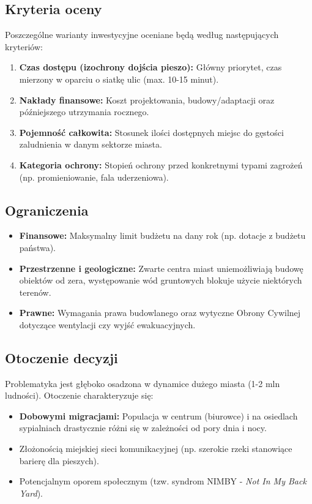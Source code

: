 \documentclass[12pt,a4paper]{article}
\begin{document}
\subsection{Kryteria oceny}
Poszczególne warianty inwestycyjne oceniane będą według następujących kryteriów:
\begin{enumerate}
    \item \textbf{Czas dostępu (izochrony dojścia pieszo):} Główny priorytet, czas mierzony w oparciu o siatkę ulic (max. 10-15 minut).
    \item \textbf{Nakłady finansowe:} Koszt projektowania, budowy/adaptacji oraz późniejszego utrzymania rocznego.
    \item \textbf{Pojemność całkowita:} Stosunek ilości dostępnych miejsc do gęstości zaludnienia w danym sektorze miasta.
    \item \textbf{Kategoria ochrony:} Stopień ochrony przed konkretnymi typami zagrożeń (np. promieniowanie, fala uderzeniowa).
\end{enumerate}

\subsection{Ograniczenia}
\begin{itemize}
    \item \textbf{Finansowe:} Maksymalny limit budżetu na dany rok (np. dotacje z budżetu państwa).
    \item \textbf{Przestrzenne i geologiczne:} Zwarte centra miast uniemożliwiają budowę obiektów od zera, występowanie wód gruntowych blokuje użycie niektórych terenów.
    \item \textbf{Prawne:} Wymagania prawa budowlanego oraz wytyczne Obrony Cywilnej dotyczące wentylacji czy wyjść ewakuacyjnych.
\end{itemize}

\subsection{Otoczenie decyzji}
Problematyka jest głęboko osadzona w dynamice dużego miasta (1-2 mln ludności). Otoczenie charakteryzuje się:
\begin{itemize}
    \item \textbf{Dobowymi migracjami:} Populacja w centrum (biurowce) i na osiedlach sypialniach drastycznie różni się w zależności od pory dnia i nocy.
    \item Złożonością miejskiej sieci komunikacyjnej (np. szerokie rzeki stanowiące barierę dla pieszych).
    \item Potencjalnym oporem społecznym (tzw. syndrom NIMBY - \textit{Not In My Back Yard}).
\end{itemize}
\end{document}
